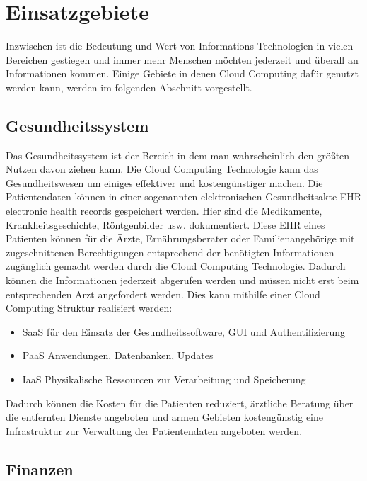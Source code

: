 \section{Einsatzgebiete}
Inzwischen ist die Bedeutung und Wert von Informations Technologien in vielen Bereichen gestiegen und immer mehr Menschen möchten jederzeit und überall an Informationen kommen. Einige Gebiete in denen Cloud Computing dafür genutzt werden kann, werden im folgenden Abschnitt vorgestellt.

\subsection{Gesundheitssystem}
Das Gesundheitssystem ist der Bereich in dem man wahrscheinlich den größten Nutzen davon ziehen kann. Die Cloud Computing Technologie kann das Gesundheitswesen um einiges effektiver und kostengünstiger machen. Die Patientendaten können in einer sogenannten elektronischen Gesundheitsakte EHR \glqq electronic health records\grqq{} gespeichert werden. Hier sind die Medikamente, Krankheitsgeschichte, Röntgenbilder usw. dokumentiert. Diese EHR eines Patienten können für die Ärzte, Ernährungsberater oder Familienangehörige mit zugeschnittenen Berechtigungen entsprechend der benötigten Informationen zugänglich gemacht werden durch die Cloud Computing Technologie. Dadurch können die Informationen jederzeit abgerufen werden und müssen nicht erst beim entsprechenden Arzt angefordert werden. Dies kann mithilfe einer Cloud Computing Struktur realisiert werden:
\begin{itemize}
	\item SaaS für den Einsatz der Gesundheitssoftware, GUI und Authentifizierung
	\item PaaS Anwendungen, Datenbanken, Updates
	\item IaaS Physikalische Ressourcen zur Verarbeitung und Speicherung
\end{itemize} 

Dadurch können die Kosten für die Patienten reduziert, ärztliche Beratung über die entfernten Dienste angeboten und armen Gebieten kostengünstig eine Infrastruktur zur Verwaltung der Patientendaten angeboten werden.

\subsection{Finanzen}